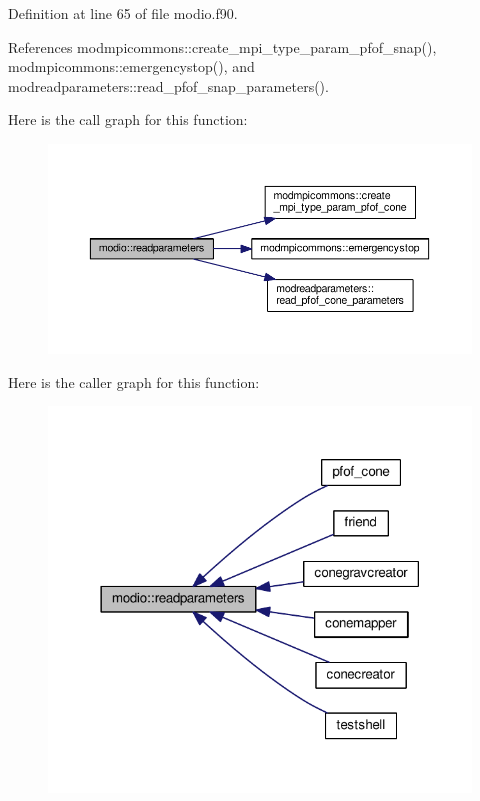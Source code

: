 Definition at line 65 of file modio.\-f90.



References modmpicommons\-::create\-\_\-mpi\-\_\-type\-\_\-param\-\_\-pfof\-\_\-snap(), modmpicommons\-::emergencystop(), and modreadparameters\-::read\-\_\-pfof\-\_\-snap\-\_\-parameters().



Here is the call graph for this function\-:
\nopagebreak
\begin{figure}[H]
\begin{center}
\leavevmode
\includegraphics[width=350pt]{classmodio_add45280540db1513b0ec12d80d94481d_cgraph}
\end{center}
\end{figure}




Here is the caller graph for this function\-:\nopagebreak
\begin{figure}[H]
\begin{center}
\leavevmode
\includegraphics[width=318pt]{classmodio_add45280540db1513b0ec12d80d94481d_icgraph}
\end{center}
\end{figure}


